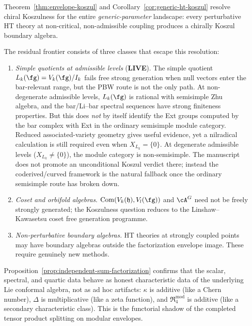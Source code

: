 \begin{remark}
\label{rem:true-residual-frontier}
Theorem~\textup{\ref{thm:envelope-koszul}} and
Corollary~\textup{\ref{cor:generic-ht-koszul}}
resolve chiral Koszulness for the entire
\emph{generic-parameter} landscape: every perturbative
HT theory at non-critical, non-admissible coupling
produces a chirally Koszul boundary algebra.

The residual frontier consists of three classes
that escape this resolution:
\begin{enumerate}[label=\textup{(\alph*)}]
\item \emph{Simple quotients at admissible levels}
  \textup{(}\textbf{LIVE}\textup{)}.
  The simple quotient $L_k(\fg) = V_k(\fg)/I_k$
  fails free strong generation when null vectors
  enter the bar-relevant range, but the PBW route is
  not the only path.  At non-degenerate admissible
  levels, $L_k(\fg)$ is rational with semisimple Zhu
  algebra, and the bar/Li--bar spectral sequences have
  strong finiteness properties.  But this does \emph{not}
  by itself identify the Ext groups computed by the bar
  complex with Ext in the ordinary semisimple module
  category.  Reduced associated-variety geometry gives
  useful evidence, yet a nilradical calculation is still
  required even when $X_{L_k} = \{0\}$.
  At degenerate admissible levels
  \textup{(}$X_{L_k} \neq \{0\}$\textup{)}, the module
  category is non-semisimple.  The manuscript does not
  promote an unconditional Koszul verdict there; instead the
  coderived/curved framework is the natural fallback once the
  ordinary semisimple route has broken down.
\item \emph{Coset and orbifold algebras.}
  $\operatorname{Com}(V_k(\mathfrak{h}), V_l(\fg))$ and
  $\cA^G$ need not be freely strongly generated;
  the Koszulness question reduces to the
  Linshaw--Kawasetsu coset free generation programme.
\item \emph{Non-perturbative boundary algebras.}
  HT theories at strongly coupled points may have
  boundary algebras outside the factorization envelope
  image.  These require genuinely new methods.
\end{enumerate}
\end{remark}

\begin{remark}
\label{rem:shadow-characteristic-data}
Proposition~\ref{prop:independent-sum-factorization}
confirms that the scalar, spectral, and quartic data
behave as honest characteristic data of the underlying
Lie conformal algebra, not as ad hoc artifacts:
$\kappa$ is additive (like a Chern number),
$\Delta$ is multiplicative (like a zeta function), and
$\mathfrak{R}_4^{\mathrm{mod}}$ is additive
(like a secondary characteristic class).
This is the functorial shadow of the completed tensor
product splitting on modular envelopes.
\end{remark}

